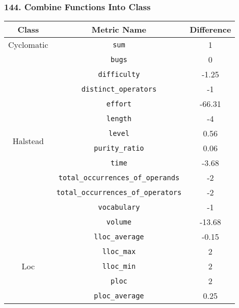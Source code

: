 \subsubsection{ 144. Combine Functions Into Class }

\begin{center}
  \begin{tabular}{ |c|c|c| }
    \hline

    Class & Metric Name                           & Difference \\

    \hline

    \multirow{ 1 }{6em}{ Cyclomatic }
          & \verb|sum|                            & 1          \\
    \hline
    \multirow{ 12 }{6em}{ Halstead }
          & \verb|bugs|                           & 0          \\
          & \verb|difficulty|                     & -1.25      \\
          & \verb|distinct_operators|             & -1         \\
          & \verb|effort|                         & -66.31     \\
          & \verb|length|                         & -4         \\
          & \verb|level|                          & 0.56       \\
          & \verb|purity_ratio|                   & 0.06       \\
          & \verb|time|                           & -3.68      \\
          & \verb|total_occurrences_of_operands|  & -2         \\
          & \verb|total_occurrences_of_operators| & -2         \\
          & \verb|vocabulary|                     & -1         \\
          & \verb|volume|                         & -13.68     \\
    \hline
    \multirow{ 11 }{6em}{ Loc }
          & \verb|lloc_average|                   & -0.15      \\
          & \verb|lloc_max|                       & 2          \\
          & \verb|lloc_min|                       & 2          \\
          & \verb|ploc|                           & 2          \\
          & \verb|ploc_average|                   & 0.25       \\

\end{tabular}
\end{center}
